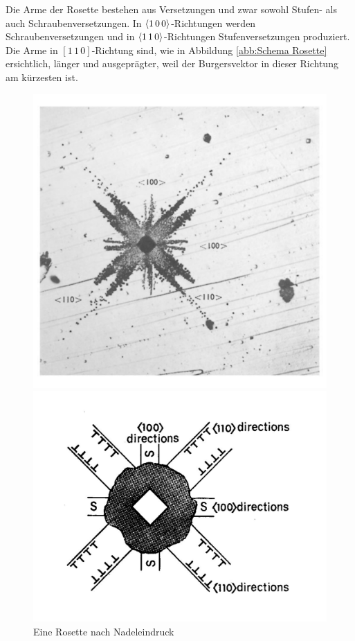 \documentclass[12pt,a4paper]{scrartcl}
\numberwithin{equation}{section} %
\begin{document}
Die Arme der Rosette bestehen aus Versetzungen und zwar sowohl Stufen-
als auch Schraubenversetzungen. In $\expval{1\,0\,0}$-Richtungen werden Schraubenversetzungen und in $\expval{1\,1\,0}$-Richtungen Stufenversetzungen produziert. Die Arme in $[1\,1\,0]$-Richtung sind,
wie in Abbildung \ref{abb:Schema Rosette} ersichtlich, länger und ausgeprägter, weil der Burgersvektor in dieser Richtung am kürzesten ist.

\begin{figure}[ht]
	\begin{minipage}[t]{.3\linewidth}
		\includegraphics[width=\textwidth]{../media/B2.8/Nadeleindruck.pdf}
		\caption{Eine Rosette nach Nadeleindruck \cite[S. 18]{Newey}}
		\label{abb:Rosette}
	\end{minipage}
	\begin{minipage}[t]{.3\linewidth}
		\includegraphics[width=\textwidth]{../media/B2.8/Rosette_Schema.pdf}

\end{minipage}
\end{figure}
\end{document}
